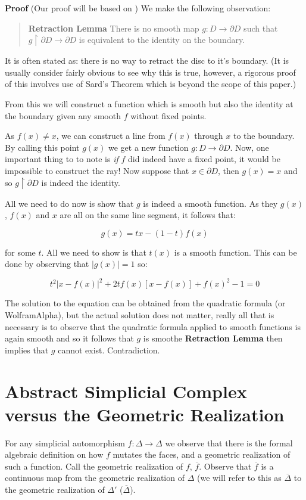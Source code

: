 \documentclass[a4paper]{article}
\newcommand{\ol}{\overline}
\begin{document}
\textbf{Proof} (Our proof will be based on \cite{guil}) We make the following observation: 

\begin{quote}
    \textbf{Retraction Lemma} There is no smooth map $g : D \to \partial D$ such that $g \upharpoonright \partial D \to \partial D$ is equivalent to the identity on the boundary.
\end{quote}

It is often stated as: there is no way to retract the disc to it's boundary. (It is usually consider fairly obvious to see why this is true, however, a rigorous proof of this involves use of Sard's Theorem which is beyond the scope of this paper.)

From this we will construct a function which is smooth but also the identity at the boundary given any smooth $f$ without fixed points.

As $f(x) \neq x$, we can construct a line from $f(x)$ through $x$ to the boundary. By calling this point $g(x)$ we get a new function $g : D \to \partial D$. Now, one important thing to to note is \textit{if} $f$ did indeed have a fixed point, it would be impossible to construct the ray! Now suppose that $x \in \partial D$, then $g(x) = x$ and so $g \upharpoonright \partial D$ is indeed the identity.

All we need to do now is show that $g$ is indeed a smooth function. As they $g(x)$, $f(x)$ and $x$ are all on the same line segment, it follows that:

$$g(x) = tx - (1 - t)f(x)$$

for some $t$. All we need to show is that $t(x)$ is a smooth function. This can be done by observing that $|g(x)| = 1$ so:

$$t^2|x - f(x)|^2 + 2tf(x)[x - f(x)] + f(x)^2 - 1 = 0$$

The solution to the equation can be obtained from the quadratic formula (or WolframAlpha), but the actual solution does not matter, really all that is necessary is to observe that the quadratic formula applied to smooth functions is again smooth and so it follows that $g$ is smoothe \textbf{Retraction Lemma} then implies that $g$ cannot exist. Contradiction.

\section{Abstract Simplicial Complex versus the Geometric Realization}

For any simplicial automorphism $f : \Delta \to \Delta$ we observe that there is the formal algebraic definition on how $f$ mutates the faces, and a geometric realization of such a function. Call the geometric realization of $f$, $\ol{f}$. Observe that $\ol{f}$ is a continuous map from the geometric realization of $\Delta$ (we will refer to this as $\ol{\Delta}$ to the geometric realization of $\Delta'$ ($\ol{\Delta}$).
\end{document}

